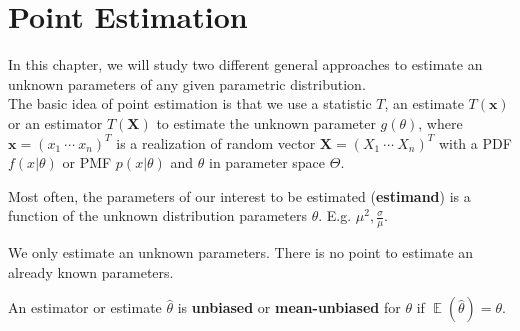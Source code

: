 \documentclass{huhtakm-template-book-v2}
\DeclareMathOperator{\E}{\mathbb{E}}
\begin{document}
\chapter{Point Estimation}
In this chapter, we will study two different general approaches to estimate an unknown parameters of any given parametric distribution.\\
The basic idea of point estimation is that we use a statistic $T$, an estimate $T(\mathbf{x})$ or an estimator $T(\mathbf{X})$ to estimate the unknown parameter $g(\theta)$, where $\mathbf{x}=(x_{1}\ \cdots\ x_{n})^{T}$ is a realization of random vector $\mathbf{X}=(X_{1}\ \cdots\ X_{n})^{T}$ with a PDF $f(x|\theta)$ or PMF $p(x|\theta)$ and $\theta$ in parameter space $\Theta$.
\begin{rem}
	Most often, the parameters of our interest to be estimated (\textbf{estimand}) is a function of the unknown distribution parameters $\theta$. E.g. $\mu^{2},\frac{\sigma}{\mu}$.
\end{rem}
\begin{rem}
	We only estimate an unknown parameters. There is no point to estimate an already known parameters.
\end{rem}
\begin{defn}
	An estimator or estimate $\hat{\theta}$ is \textbf{unbiased} or \textbf{mean-unbiased} for $\theta$ if $\E(\hat{\theta})=\theta$.
\end{defn}
\end{document}
